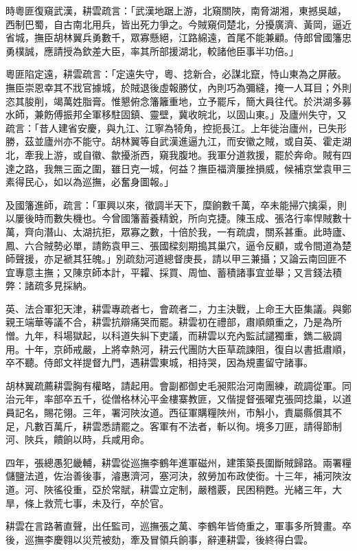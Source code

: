 \begin{pinyinscope}
時粵匪復窺武漢，耕雲疏言：「武漢地踞上游，北窺關陜，南脅湖湘，東撼吳越，西制巴蜀，自古南北用兵，皆出死力爭之。今賊窺伺楚北，分擾廣濟、黃岡，逼近省城，撫臣胡林翼兵勇數千，眾寡懸絕，江路綿遠，首尾不能兼顧。侍郎曾國籓忠勇樸誠，應請授為欽差大臣，率其所部援湖北，較諸他臣事半功倍。」

粵匪陷定遠，耕雲疏言：「定遠失守，粵、捻新合，必謀北竄，恃山東為之屏蔽。撫臣崇恩幸其不戕官據城，於賊退後虛報勝仗，內則巧為彌縫，掩一人耳目；外則恣其朘削，竭萬姓脂膏。惟懇俯念籓籬重地，立予罷斥，簡大員往代。於洪湖多募水師，兼飭傅振邦全軍移駐固鎮、靈壁，冀收皖北，以固山東。」及廬州失守，又疏言：「昔人建省安慶，與九江、江寧為犄角，控扼長江。上年徙治廬州，已失形勝，茲並廬州亦不能守。胡林翼等自武漢進逼九江，而安徽之賊，或自英、霍走湖北，牽我上游，或自徽、歙擾浙西，窺我腹地。我軍分道救援，罷於奔命。賊有四達之路，我無三面之圍，雖日克一城，何益？撫臣福濟屢挫損威，候補京堂袁甲三素得民心，如以為巡撫，必奮身圖報。」

及國籓進師，疏言：「軍興以來，徵調半天下，糜餉數千萬，卒未能掃穴擒渠，則以屢後時而數失機也。今曾國籓蓄養精銳，所向克捷。陳玉成、張洛行率悍賊數十萬，齊向潛山、太湖抗拒，眾寡之數，十倍於我，一有疏虞，關系甚重。此時廬、鳳、六合賊勢必單，請飭袁甲三、張國樑刻期搗其巢穴，逼令反顧，或令間道為楚師聲援，亦足褫其狂魄。」別疏劾河道總督庚長，請以甲三兼攝；又論云南回匪不宜專意主撫；又陳京師本計，平糶、採買、周恤、蓄積諸事宜並舉；又言錢法積弊：諸疏多見採納。

英、法合軍犯天津，耕雲專疏者七，會疏者二，力主決戰，上命王大臣集議。與鄭親王端華等議不合，耕雲抗辯痛哭而罷。耕雲初在禮部，肅順頗重之，乃是為所憎。九年，科場獄起，以科道失糾下吏議，而耕雲以充內監試譴獨重，鐫二級調用。十年，京師戒嚴，上將幸熱河，耕云代團防大臣草疏諫阻，復自以書抵肅順，卒不聽。侍郎文祥提督九門，遇耕雲東城，相持哭，因為規畫留守諸事。

胡林翼疏薦耕雲胸有權略，請起用。會副都御史毛昶熙治河南團練，疏調從軍。同治元年，率部卒五千，從僧格林沁平金樓寨教匪，又偕提督張曜克張岡捻巢，以道員記名，賜花翎。三年，署河陜汝道。西征軍購糧陜州，市斛小，責屬縣償其不足，凡數百萬斤，耕雲悉請罷之。客軍有不法者，斬以徇。境多刀匪，請得節制河、陜兵，饋餉以時，兵咸用命。

四年，張總愚犯畿輔，耕雲從巡撫李鶴年進軍磁州，建策築長圍斷賊歸路。兩署糧儲鹽法道，佐治善後事，濬惠濟河，塞河決，敘勞加布政使銜。十三年，補河陜汝道。河、陜徭役重，亞於常賦，耕雲立定制，嚴稽覈，民困稍甦。光緒三年，大旱，條上救荒七事，未及行，卒於官。

耕雲在言路著直聲，出任監司，巡撫張之萬、李鶴年皆倚重之，軍事多所贊畫。卒後，巡撫李慶翱以災荒被劾，牽及冒領兵餉事，辭連耕雲，後終得白雲。


\end{pinyinscope}

